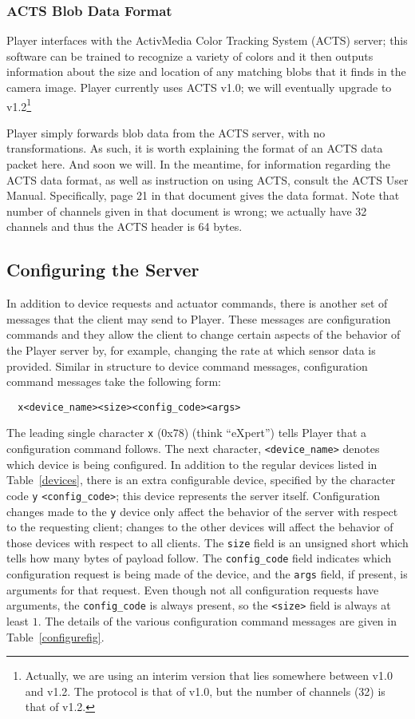 \documentclass[11pt]{article}
\begin{document}
\subsubsection{ACTS Blob Data Format}
\label{actsformat}
Player interfaces with the ActivMedia Color Tracking System (ACTS)
server; this software can be trained to recognize a variety of colors and
it then outputs information about the size and location of any matching
blobs that it finds in the camera image.  Player currently
uses ACTS v1.0; we will eventually upgrade to v1.2\footnote{Actually,
we are using an interim version that lies somewhere between v1.0 and
v1.2.  The protocol is that of v1.0, but the number of channels (32)
is that of v1.2.}

Player simply forwards blob data from the ACTS server, with no transformations.
As such, it is worth explaining the format of an ACTS data packet here.
And soon we will.  In the meantime, for information regarding the 
ACTS data format, as well as instruction on using ACTS, consult
the ACTS User Manual\cite{actsman}.
Specifically, page 21 in that document gives the data format.  Note
that number of channels given in that document is wrong; we actually
have 32 channels and thus the ACTS header is 64 bytes.

\subsection{Configuring the Server}
\label{configure}
In addition to device requests and actuator commands, there is another set of
messages that the client may send to Player.  These messages are configuration
commands and they allow the client to change certain aspects of the behavior
of the Player server by, for example, changing the rate at which sensor
data is provided.  Similar in structure to device command messages, 
configuration command messages take the following form:
\begin{verbatim}
  x<device_name><size><config_code><args>
\end{verbatim}
The leading single character {\tt x} (0x78) (think ``eXpert'') tells Player that
a configuration command follows.  The next character, 
{\tt <device\_name>} denotes which device is being configured.  In addition
to the regular devices listed in Table~\ref{devices}, there is an extra 
configurable device, specified by the character code {\tt y} 
{\tt <config\_code>}; this device represents the server itself.
Configuration changes made to the {\tt y} device only affect the behavior 
of the server with respect to the requesting client; changes to the
other devices will affect the behavior of those devices with respect
to all clients.  The {\tt size} field
is an unsigned short which tells how many bytes of payload follow.  
The {\tt config\_code} field indicates which configuration request is being
made of the device, and the {\tt args} field, if present,
is arguments for that request.  Even though not all configuration requests
have arguments, the {\tt config\_code} is always present, so the 
{\tt <size>} field is always at least $1$.
The details of the various configuration command messages 
are given in Table~\ref{configurefig}.
\end{document}
